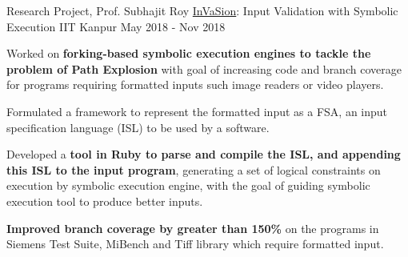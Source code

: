 \begin{cventries}


  \cventry
    {Research Project, Prof. Subhajit Roy} %
    {\href{https://arxiv.org/abs/2104.01438}{InVaSion}: Input Validation with Symbolic Execution} %
    {IIT Kanpur} %
    {May 2018 - Nov 2018} %
    {
      \begin{cvitems} %
      \item {Worked on \textbf{forking-based symbolic execution engines to tackle the problem of Path Explosion} with goal of increasing code and branch coverage for programs requiring formatted inputs such image readers or video players.}
      \item {Formulated a framework to represent the formatted input as a FSA, an input specification language (ISL) to be used by a software.}
        \item {Developed a \textbf{tool in Ruby to parse and compile the ISL, and appending this ISL to the input program}, generating a set of logical constraints on execution by symbolic execution engine, with the goal of guiding symbolic execution tool to produce better inputs.}
        \item {\textbf{Improved branch coverage by greater than 150\%} on the programs in Siemens Test Suite, MiBench and Tiff library which require formatted input.}
      \end{cvitems}
    }%





\end{cventries}
